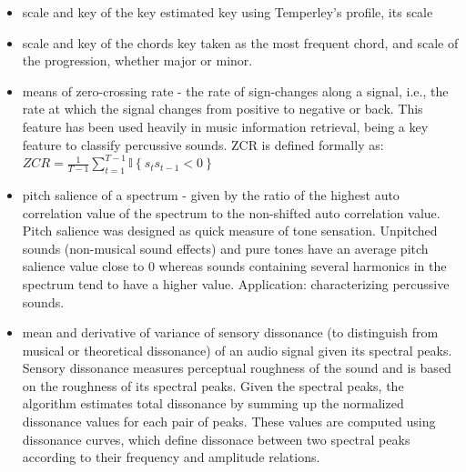 \begin{itemize}
\item scale and key of the key estimated key using Temperley’s profile, its scale

\item scale and key of the chords key taken as the most frequent chord, and scale of the progression, whether major or minor. 

\item means of zero-crossing rate - the rate of sign-changes along a signal, i.e., the rate at which the signal changes from positive to negative or back. This feature has been used heavily in music information retrieval, being a key feature to classify percussive sounds.
ZCR is defined formally as: \\
$ZCR = \frac{1}{T-1} \sum_{t=1}^{T-1} {{\mathbb I}\left\{{s_t s_{t-1} < 0}\right\}}$

\item pitch salience of a spectrum - given by the ratio of the highest auto correlation value of the spectrum to the non-shifted auto correlation value. Pitch salience was designed as quick measure of tone sensation. Unpitched sounds (non-musical sound effects) and pure tones have an average pitch salience value close to 0 whereas sounds containing several harmonics in the spectrum tend to have a higher value. Application: characterizing percussive sounds.

\item mean and derivative of variance of sensory dissonance (to distinguish from musical or theoretical dissonance) of an audio signal given its spectral peaks. Sensory dissonance measures perceptual roughness of the sound and is based on the roughness of its spectral peaks. Given the spectral peaks, the algorithm estimates total dissonance by summing up the normalized dissonance values for each pair of peaks. These values are computed using dissonance curves, which define dissonace between two spectral peaks according to their frequency and amplitude relations.  

\end{itemize}

